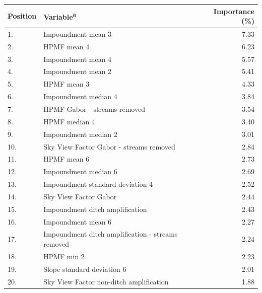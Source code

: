\documentclass[]{interact}
\theoremstyle{plain}%
\theoremstyle{definition}
\theoremstyle{remark}
\begin{document}
\begin{table} [!htb]
        {\begin{tabular}{llr}
          \toprule
          Position & Variable\textsuperscript{a} & Importance (\%) \\ \midrule
          1.  & Impoundment mean 3                                  & 7.33\\
          2.  & HPMF mean 4                                         & 6.23\\
          3.  & Impoundment mean 4                                  & 5.57\\
          4.  & Impoundment mean 2                                  & 5.41\\
          5.  & HPMF mean 3                                         & 4.33\\
          6.  & Impoundment median 4                                & 3.84\\
          7.  & HPMF Gabor - streams removed                        & 3.54\\
          8.  & HPMF median 4                                       & 3.40\\
          9.  & Impoundment median 2                                & 3.01\\
          10. & Sky View Factor Gabor - streams removed             & 2.84\\
          11. & HPMF mean 6                                         & 2.73\\
          12. & Impoundment median 6                                & 2.69\\
          13. & Impoundment standard deviation 4                    & 2.52\\
          14. & Sky View Factor Gabor                               & 2.44\\
          15. & Impoundment ditch amplification                     & 2.43\\
          16. & Impoundment mean 6                                  & 2.27\\
          17. & Impoundment ditch amplification - streams removed   & 2.24\\
          18. & HPMF min 2                                          & 2.23\\
          19. & Slope standard deviation 6                          & 2.01\\
          20. & Sky View Factor non-ditch amplification             & 1.88\\
          \bottomrule
        \end{tabular}}
    \label{featureimportancetable}
\end{table}
\end{document}
